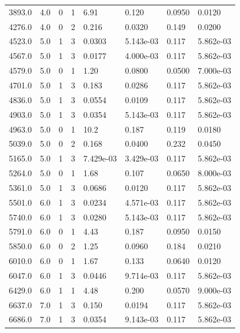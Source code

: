 \documentclass[preview]{standalone}
\begin{document}
{{\begin{tabular}{L{1.2cm}C{1.2cm} C{0.3cm}C{0.5cm} C{1.4cm}C{1.4cm} C{1.4cm}C{1.4cm}}
  3893.0  &   4.0  & 0     &  1 &  6.91  & 0.120  & 0.0950 &  0.0120   \\ 
  4276.0  &   4.0  & 0     &  2 &  0.216  & 0.0320  & 0.149 &  0.0200   \\ 
  4523.0  &   5.0  & 1     &  3 &  0.0303  & 5.143e-03  & 0.117 &  5.862e-03   \\ 
  4567.0  &   5.0  & 1     &  3 &  0.0177  & 4.000e-03  & 0.117 &  5.862e-03   \\ 
  4579.0  &   5.0  & 0     &  1 &  1.20  & 0.0800  & 0.0500 &  7.000e-03   \\ 
  4701.0  &   5.0  & 1     &  3 &  0.183  & 0.0286  & 0.117 &  5.862e-03   \\ 
  4836.0  &   5.0  & 1     &  3 &  0.0554  & 0.0109  & 0.117 &  5.862e-03   \\ 
  4903.0  &   5.0  & 1     &  3 &  0.0354  & 5.143e-03  & 0.117 &  5.862e-03   \\ 
  4963.0  &   5.0  & 0     &  1 &  10.2  & 0.187  & 0.119 &  0.0180   \\ 
  5039.0  &   5.0  & 0     &  2 &  0.168  & 0.0400  & 0.232 &  0.0450   \\ 
  5165.0  &   5.0  & 1     &  3 &  7.429e-03  & 3.429e-03  & 0.117 &  5.862e-03   \\ 
  5264.0  &   5.0  & 0     &  1 &  1.68  & 0.107  & 0.0650 &  8.000e-03   \\ 
  5361.0  &   5.0  & 1     &  3 &  0.0686  & 0.0120  & 0.117 &  5.862e-03   \\ 
  5501.0  &   6.0  & 1     &  3 &  0.0234  & 4.571e-03  & 0.117 &  5.862e-03   \\ 
  5740.0  &   6.0  & 1     &  3 &  0.0280  & 5.143e-03  & 0.117 &  5.862e-03   \\ 
  5791.0  &   6.0  & 0     &  1 &  4.43  & 0.187  & 0.0950 &  0.0150   \\ 
  5850.0  &   6.0  & 0     &  2 &  1.25  & 0.0960  & 0.184 &  0.0210   \\ 
  6010.0  &   6.0  & 0     &  1 &  1.67  & 0.133  & 0.0640 &  0.0120   \\ 
  6047.0  &   6.0  & 1     &  3 &  0.0446  & 9.714e-03  & 0.117 &  5.862e-03   \\ 
  6429.0  &   6.0  & 1     &  1 &  4.48  & 0.200  & 0.0570 &  9.000e-03   \\ 
  6637.0  &   7.0  & 1     &  3 &  0.150  & 0.0194  & 0.117 &  5.862e-03   \\ 
  6686.0  &   7.0  & 1     &  3 &  0.0354  & 9.143e-03  & 0.117 &  5.862e-03   \\ 

\end{tabular}}}
\end{document}
